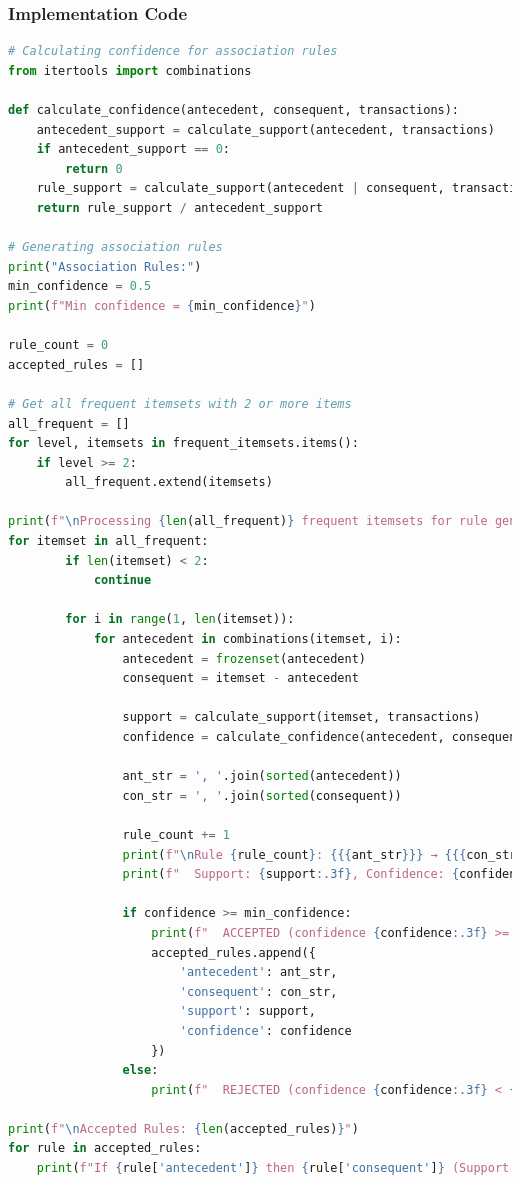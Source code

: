 \documentclass[12pt,a4paper]{article}
\begin{document}
\subsubsection{Implementation Code}
\begin{lstlisting}[language=Python, caption=Extract Rules and Interpret Them]
# Calculating confidence for association rules
from itertools import combinations

def calculate_confidence(antecedent, consequent, transactions):
    antecedent_support = calculate_support(antecedent, transactions)
    if antecedent_support == 0:
        return 0
    rule_support = calculate_support(antecedent | consequent, transactions)
    return rule_support / antecedent_support

# Generating association rules
print("Association Rules:")
min_confidence = 0.5
print(f"Min confidence = {min_confidence}")

rule_count = 0
accepted_rules = []

# Get all frequent itemsets with 2 or more items
all_frequent = []
for level, itemsets in frequent_itemsets.items():
    if level >= 2:
        all_frequent.extend(itemsets)

print(f"\nProcessing {len(all_frequent)} frequent itemsets for rule generation:")
for itemset in all_frequent:
        if len(itemset) < 2:
            continue
        
        for i in range(1, len(itemset)):
            for antecedent in combinations(itemset, i):
                antecedent = frozenset(antecedent)
                consequent = itemset - antecedent
                
                support = calculate_support(itemset, transactions)
                confidence = calculate_confidence(antecedent, consequent, transactions)
                
                ant_str = ', '.join(sorted(antecedent))
                con_str = ', '.join(sorted(consequent))
                
                rule_count += 1
                print(f"\nRule {rule_count}: {{{ant_str}}} → {{{con_str}}}")
                print(f"  Support: {support:.3f}, Confidence: {confidence:.3f}")
                
                if confidence >= min_confidence:
                    print(f"  ACCEPTED (confidence {confidence:.3f} >= {min_confidence})")
                    accepted_rules.append({
                        'antecedent': ant_str,
                        'consequent': con_str,
                        'support': support,
                        'confidence': confidence
                    })
                else:
                    print(f"  REJECTED (confidence {confidence:.3f} < {min_confidence})")

print(f"\nAccepted Rules: {len(accepted_rules)}")
for rule in accepted_rules:
    print(f"If {rule['antecedent']} then {rule['consequent']} (Support: {rule['support']:.3f}, Confidence: {rule['confidence']:.3f})")
\end{lstlisting}
\end{document}

